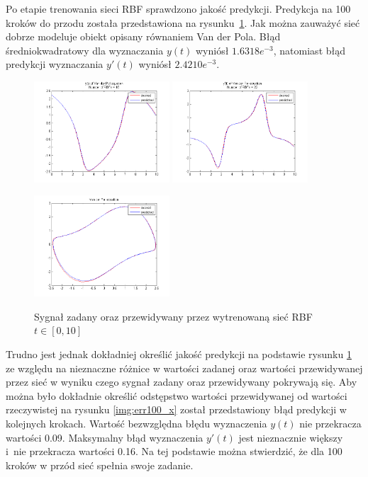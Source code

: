 Po etapie trenowania sieci RBF sprawdzono jakość predykcji. Predykcja na 100 kroków do przodu została przedstawiona na rysunku~\ref{img:predicted}. Jak można zauważyć sieć dobrze modeluje obiekt opisany równaniem Van der Pola. Błąd średniokwadratowy dla wyznaczania $y(t)$ wyniósł  $1.6318e^{-3}$, natomiast błąd predykcji wyznaczania $y'(t)$ wyniósł $2.4210e^{-3}$.

\begin{figure}[ht!]
	\centering

	\subfloat
	{\includegraphics[width=0.45\textwidth]
	{images/signal_pred100.png}}
	\subfloat
	{\includegraphics[width=0.45\textwidth]
	{images/deriv_pred100.png}}	
	
	\subfloat
	{\includegraphics[width=0.45\textwidth]
	{images/trajectory_pred100.png}}

	\caption{Sygnał zadany oraz przewidywany przez wytrenowaną sieć RBF $t \in [0,10]$}
	\label{img:predicted}
\end{figure}

Trudno jest jednak dokładniej określić jakość predykcji na podstawie rysunku \ref{img:predicted} ze względu na nieznaczne różnice w wartości zadanej oraz wartości przewidywanej przez sieć w wyniku czego sygnał zadany oraz przewidywany pokrywają się. Aby można było dokładnie określić odstępstwo wartości przewidywanej od wartości rzeczywistej na rysunku \ref{img:err100_x} został przedstawiony błąd predykcji w kolejnych krokach. Wartość bezwzględna błędu wyznaczenia $y(t)$ nie przekracza wartości 0.09. Maksymalny błąd wyznaczenia $y'(t)$ jest nieznacznie większy i~nie przekracza wartości 0.16. Na tej podstawie można stwierdzić, że dla 100 kroków w przód sieć spełnia swoje zadanie. 

